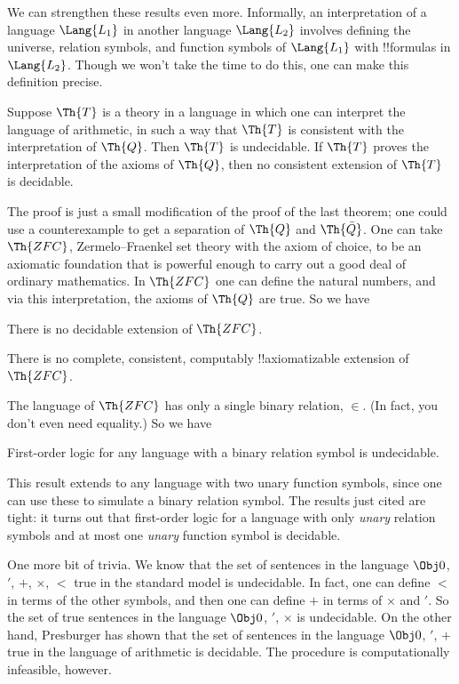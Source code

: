 \documentclass[../../../include/open-logic-section]{subfiles}
\begin{document}

We can strengthen these results even more. Informally, an
interpretation of a language $\Lang{L_1}$ in another language
$\Lang{L_2}$ involves defining the universe, relation symbols, and
function symbols of $\Lang{L_1}$ with !!{formula}s in
$\Lang{L_2}$. Though we won't take the time to do this, one can make
this definition precise.

\begin{thm}
  Suppose $\Th{T}$ is a theory in a language in which one can
  interpret the language of arithmetic, in such a way that $\Th{T}$ is
  consistent with the interpretation of $\Th{Q}$. Then $\Th{T}$ is
  undecidable. If $\Th{T}$ proves the interpretation of the axioms of
  $\Th{Q}$, then no consistent extension of $\Th{T}$ is decidable.
\end{thm}

The proof is just a small modification of the proof of the last
theorem; one could use a counterexample to get a separation of $\Th{Q}$ and
$\Th{\bar Q}$. One can take $\Th{ZFC}$, Zermelo--Fraenkel set theory with the
axiom of choice, to be an axiomatic foundation that is powerful enough
to carry out a good deal of ordinary mathematics. In $\Th{ZFC}$ one
can define the natural numbers, and via this interpretation, the
axioms of $\Th{Q}$ are true. So we have

\begin{cor}
There is no decidable extension of $\Th{ZFC}$.
\end{cor}

\begin{cor}
There is no complete, consistent, computably !!{axiomatizable} extension of
$\Th{ZFC}$. 
\end{cor}

The language of $\Th{ZFC}$ has only a single binary relation,
$\in$. (In fact, you don't even need equality.) So we have

\begin{cor}
First-order logic for any language with a binary relation symbol is
undecidable.
\end{cor}

This result extends to any language with two unary function symbols,
since one can use these to simulate a binary relation symbol. The
results just cited are tight: it turns out that first-order logic for
a language with only \emph{unary} relation symbols and at most one
\emph{unary} function symbol is decidable.

One more bit of trivia. We know that the set of sentences in the
language $\Obj 0$, $'$, $+$, $\times$, $<$ true in the standard model
is undecidable. In fact, one can define $<$ in terms of the other
symbols, and then one can define $+$ in terms of $\times$ and $'$. So
the set of true sentences in the language $\Obj 0$, $'$, $\times$ is
undecidable. On the other hand, Presburger has shown that the set of
sentences in the language $\Obj 0$, $'$, $+$ true in the language of
arithmetic is decidable. The procedure is computationally infeasible,
however.
\end{document}
